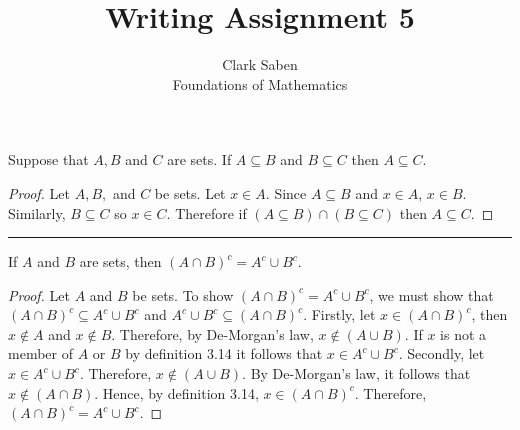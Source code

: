 \documentclass[12pt]{article}
\newenvironment{theorem}[2][Theorem]{\begin{trivlist}
\item[\hskip \labelsep {\bfseries #1}\hskip \labelsep {\bfseries #2.}]}{\end{trivlist}}
\begin{document}
 
 
\title{Writing Assignment 5}%
\author{Clark Saben\\ %
Foundations of Mathematics} %
 
\maketitle

 
\begin{theorem}{3.10}
	Suppose that $A, B$ and $C$ are sets. If $A \subseteq B$ and $B \subseteq C$ then $A \subseteq C$.
\end{theorem}
\begin{proof}
	Let $A, B,$ and $C$ be sets. Let $x \in A$. Since $A \subseteq B$ and $x \in A$, $x \in B$. Similarly,
	$B \subseteq C$ so $x \in C$. Therefore if $\left(A \subseteq B \right) \cap  \left(B \subseteq C \right)$ then $A \subseteq C$.
\end{proof}

\hrule

\begin{theorem}{3.21b}
	If $A$ and $B$ are sets, then $\left(A \cap B \right)^{c} = A^{c} \cup B^{c}$.
\end{theorem}
\begin{proof}
	Let $A$ and $B$ be sets. To show  $\left(A \cap B \right)^{c} = A^{c} \cup B^{c}$,
	we must show that $\left(A \cap B \right)^{c} \subseteq A^{c} \cup B^{c}$ and $A^{c} \cup B^{c} \subseteq \left(A \cap B \right)^{c}$.
	Firstly, let $x \in (A \cap B)^c$, then  $x \notin A$ and $x \notin B$. Therefore, by 
	De-Morgan's law, $x \notin \left(A \cup B \right)$. If $x$ is not a  member of 
	$A$ or $B$ by definition 3.14 it follows that $x \in A^c \cup B^c$.
	Secondly, let $x \in A^c \cup B^c$. Therefore, $x \notin\left( A \cup B \right)$. By 
	De-Morgan's law, it follows that $x \notin (A \cap B)$. Hence, by definition 3.14,
	$x \in \left( A \cap B \right)^c$. Therefore, $\left(A \cap B \right)^{c} = A^{c} \cup B^{c}$.
\end{proof}


    



 
 
\end{document}
